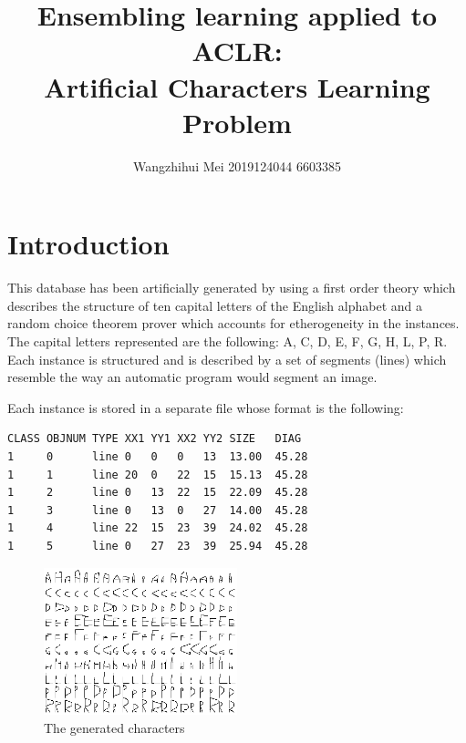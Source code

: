 \documentclass[11pt,en]{elegantpaper}
\title{Ensembling learning applied to ACLR:\\ Artificial Characters Learning Problem}
\author{Wangzhihui Mei 2019124044 6603385}
\institute{CCNU-UOW JI}
\date{}
\begin{document}
\maketitle



\section{Introduction}
This database has been artificially generated by using a first order theory which describes the structure of ten capital letters of the English alphabet and a random choice theorem prover which accounts for etherogeneity in the instances. The capital letters represented are the following: A, C, D, E, F, G, H, L, P, R. Each instance is structured and is described by a set of segments (lines) which resemble the way an automatic program would segment an image. 

Each instance is stored in a separate file whose format is the following:
\begin{lstlisting}
CLASS OBJNUM TYPE XX1 YY1 XX2 YY2 SIZE   DIAG
1     0      line 0   0   0   13  13.00  45.28
1     1      line 20  0   22  15  15.13  45.28
1     2      line 0   13  22  15  22.09  45.28
1     3      line 0   13  0   27  14.00  45.28
1     4      line 22  15  23  39  24.02  45.28
1     5      line 0   27  23  39  25.94  45.28
\end{lstlisting}

\begin{figure}[h]
	\centering
	\includegraphics[width=0.5\textwidth]{image/chars}
	\caption{The generated characters}
	\label{chars}
\end{figure}
\end{document}

